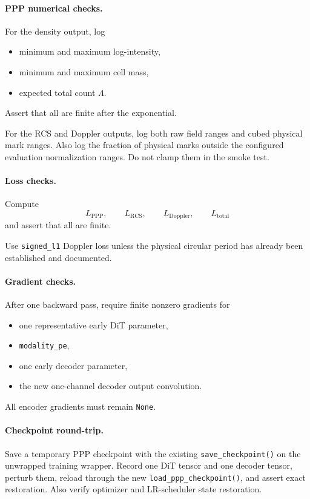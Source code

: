 \documentclass[11pt,a4paper]{article}
\begin{document}
\paragraph{PPP numerical checks.}
For the density output, log
\begin{itemize}
    \item minimum and maximum log-intensity,
    \item minimum and maximum cell mass,
    \item expected total count \(\Lambda\).
\end{itemize}
Assert that all are finite after the exponential.

For the RCS and Doppler outputs, log both raw field ranges and cubed physical mark ranges. Also log the fraction of physical marks outside the configured evaluation normalization ranges. Do not clamp them in the smoke test.

\paragraph{Loss checks.}
Compute
\[
L_{\mathrm{PPP}},
\qquad
L_{\mathrm{RCS}},
\qquad
L_{\mathrm{Doppler}},
\qquad
L_{\mathrm{total}}
\]
and assert that all are finite.

Use \texttt{signed\_l1} Doppler loss unless the physical circular period has already been established and documented.

\paragraph{Gradient checks.}
After one backward pass, require finite nonzero gradients for
\begin{itemize}
    \item one representative early DiT parameter,
    \item \texttt{modality\_pe},
    \item one early decoder parameter,
    \item the new one-channel decoder output convolution.
\end{itemize}
All encoder gradients must remain \texttt{None}.

\paragraph{Checkpoint round-trip.}
Save a temporary PPP checkpoint with the existing \texttt{save\_checkpoint()} on the unwrapped training wrapper. Record one DiT tensor and one decoder tensor, perturb them, reload through the new \texttt{load\_ppp\_checkpoint()}, and assert exact restoration. Also verify optimizer and LR-scheduler state restoration.
\end{document}
